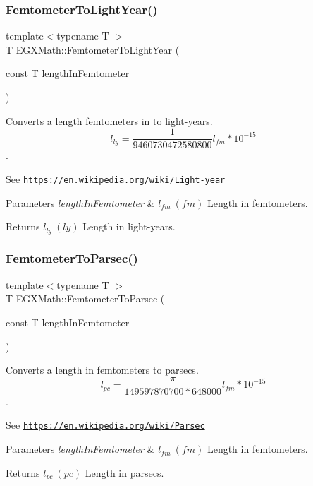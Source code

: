 \subsubsection{\texorpdfstring{Femtometer\+To\+Light\+Year()}{FemtometerToLightYear()}}
{\footnotesize\ttfamily template$<$typename T $>$ \\
T E\+G\+X\+Math\+::\+Femtometer\+To\+Light\+Year (\begin{DoxyParamCaption}\item[{const T}]{length\+In\+Femtometer }\end{DoxyParamCaption})}



Converts a length femtometers in to light-\/years. \[ l_{ly}= \frac{1}{9460730472580800} l_{fm} * 10^{-15} \]. 

See \href{https://en.wikipedia.org/wiki/Light-year}{\tt https\+://en.\+wikipedia.\+org/wiki/\+Light-\/year} 
\begin{DoxyParams}{Parameters}
{\em length\+In\+Femtometer} & $ l_{fm}\ (fm)$ Length in femtometers. \\
\hline
\end{DoxyParams}
\begin{DoxyReturn}{Returns}
$ l_{ly}\ (ly)$ Length in light-\/years. 
\end{DoxyReturn}
\mbox{\label{group___e_g_x_math-_conversions-_length_conversions-_femtometer-_astronomical_ga40144bb4cb7d474b9a22394a0f321faa}} 
\subsubsection{\texorpdfstring{Femtometer\+To\+Parsec()}{FemtometerToParsec()}}
{\footnotesize\ttfamily template$<$typename T $>$ \\
T E\+G\+X\+Math\+::\+Femtometer\+To\+Parsec (\begin{DoxyParamCaption}\item[{const T}]{length\+In\+Femtometer }\end{DoxyParamCaption})}



Converts a length in femtometers to parsecs. \[ l_{pc}=\frac{\pi}{149597870700 * 648000} l_{fm} * 10^{-15} \]. 

See \href{https://en.wikipedia.org/wiki/Parsec}{\tt https\+://en.\+wikipedia.\+org/wiki/\+Parsec} 
\begin{DoxyParams}{Parameters}
{\em length\+In\+Femtometer} & $ l_{fm}\ (fm)$ Length in femtometers. \\
\hline
\end{DoxyParams}
\begin{DoxyReturn}{Returns}
$ l_{pc}\ (pc)$ Length in parsecs. 
\end{DoxyReturn}
